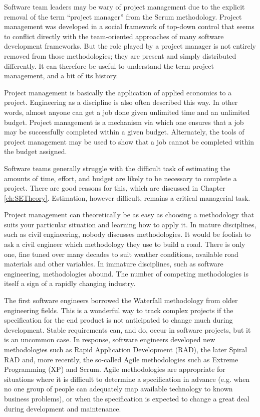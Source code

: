 Software team leaders may be wary of project management due to the explicit removal of the term ``project manager'' from the Scrum methodology. Project management was developed in a social framework of top-down control that seems to conflict directly with the team-oriented approaches of many software development frameworks. But the role played by a project manager is not entirely removed from those methodologies; they are present and simply distributed differently. It can therefore be useful to understand the term project management, and a bit of its history.

Project management is basically the application of applied economics to a project. Engineering as a discipline is also often described this way. In other words, almost anyone can get a job done given unlimited time and an unlimited budget.  Project management is a mechanism via which one ensures that a job may be successfully completed within a given budget.  Alternately, the tools of project management may be used to show that a job cannot be completed within the budget assigned.

Software teams generally struggle with the difficult task of estimating the amounts of time, effort, and budget are likely to be necessary to complete a project. There are good reasons for this, which are discussed in Chapter \ref{ch:SETheory}. Estimation, however difficult, remains a critical managerial task.

Project management can theoretically be as easy as choosing a methodology that suits your particular situation and learning how to apply it.  In mature disciplines, such as civil engineering, nobody discusses methodologies.  It would be foolish to ask a civil engineer which methodology they use to build a road.  There is only one, fine tuned over many decades to suit weather conditions, available road materials and other variables.  In immature disciplines, such as software engineering, methodologies abound. The number of competing methodologies is itself a sign of a rapidly changing industry.

The first software engineers borrowed the Waterfall methodology from older engineering fields. This is a wonderful way to track complex projects if the specification for the end product is not anticipated to change much during development. Stable requirements can, and do, occur in software projects, but it is an uncommon case. In response, software engineers developed new methodologies such as Rapid Application Development (RAD), the later Spiral RAD and, more recently, the so-called Agile methodologies such as Extreme Programming (XP) and Scrum.  Agile methodologies are appropriate for situations where it is difficult to determine a specification in advance (e.g. when no one group of people can adequately map available technology to known business problems), or when the specification is expected to change a great deal during development and maintenance.

